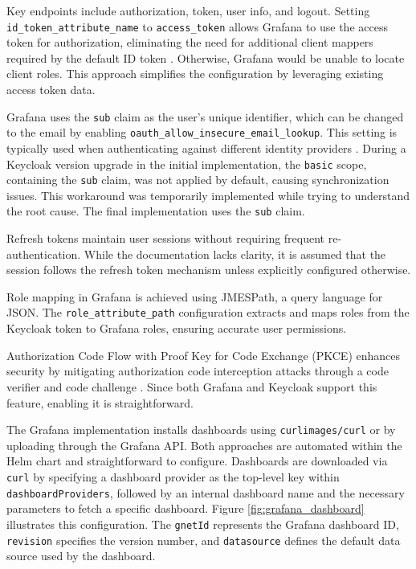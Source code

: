 Key endpoints include authorization, token, user info, and logout. Setting \texttt{id\_token\_attribute\_name} to \texttt{access\_token} allows Grafana to use the access token for authorization, eliminating the need for additional client mappers required by the default ID token \parencite{grafana_oauth}. Otherwise, Grafana would be unable to locate client roles. This approach simplifies the configuration by leveraging existing access token data.

Grafana uses the \texttt{sub} claim as the user's unique identifier, which can be changed to the email by enabling \texttt{oauth\_allow\_insecure\_email\_lookup}. This setting is typically used when authenticating against different identity providers \parencite{grafana_authentication}. During a Keycloak version upgrade in the initial implementation, the \texttt{basic} scope, containing the \texttt{sub} claim, was not applied by default, causing synchronization issues. This workaround was temporarily implemented while trying to understand the root cause. The final implementation uses the \texttt{sub} claim.

Refresh tokens maintain user sessions without requiring frequent re-authentication. While the documentation lacks clarity, it is assumed that the session follows the refresh token mechanism unless explicitly configured otherwise.

Role mapping in Grafana is achieved using JMESPath, a query language for JSON. The \texttt{role\_attribute\_path} configuration extracts and maps roles from the Keycloak token to Grafana roles, ensuring accurate user permissions.

Authorization Code Flow with Proof Key for Code Exchange (PKCE) enhances security by mitigating authorization code interception attacks through a code verifier and code challenge \parencite{auth0_pkce}. Since both Grafana and Keycloak support this feature, enabling it is straightforward.

The Grafana implementation installs dashboards using \texttt{curlimages/curl} or by uploading through the Grafana API. Both approaches are automated within the Helm chart and straightforward to configure. Dashboards are downloaded via \texttt{curl} by specifying a dashboard provider as the top-level key within \texttt{dashboard\allowbreak Providers}, followed by an internal dashboard name and the necessary parameters to fetch a specific dashboard. Figure \ref{fig:grafana_dashboard} illustrates this configuration. The \texttt{gnetId} represents the Grafana dashboard ID, \texttt{revision} specifies the version number, and \texttt{datasource} defines the default data source used by the dashboard.

